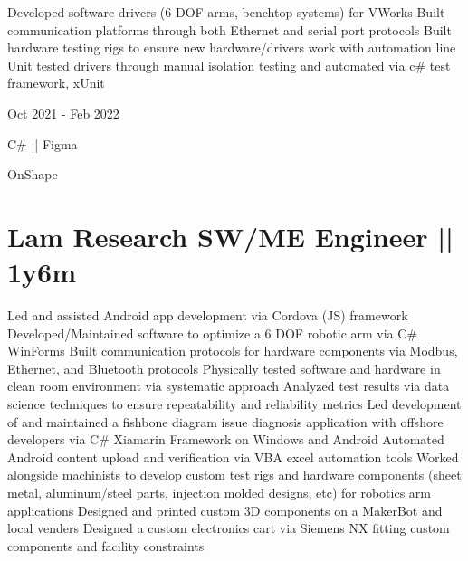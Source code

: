 \vspace{-2.5ex}
\begin{detail}
    \BulletItem
    Developed software drivers (6 DOF arms, benchtop systems) for VWorks
    \BulletItem
    Built communication platforms through both Ethernet and serial port protocols
    \BulletItem
    Built hardware testing rigs to ensure new hardware/drivers work with automation line
    \BulletItem
    Unit tested drivers through manual isolation testing and automated via c\# test framework, xUnit
\end{detail}

\begin{subtitle}
    \vspace{-13.0ex}
    {{Oct 2021 - Feb 2022}}
\end{subtitle}

{\vspace{5ex} \color{cyan}\small {C\# || Figma}}

{
\vspace{-2.5ex}\hspace{3.17in} \color{cyan} \small
{OnShape} }
\vspace{1ex}


\section
{\textbf{Lam Research} \newline
SW/ME Engineer || 1y6m}{}

\vspace{-2.5ex}
\begin{detail}
    \BulletItem
    Led and assisted Android app development via Cordova (JS) framework
    \BulletItem
    Developed/Maintained software to optimize a 6 DOF robotic arm via C\# WinForms
    \BulletItem
    Built communication protocols for hardware components via Modbus, Ethernet, and Bluetooth protocols
    \BulletItem
    Physically tested software and hardware in clean room environment via systematic approach
    \BulletItem
    Analyzed test results via data science techniques to ensure repeatability and reliability metrics
    \BulletItem
    Led development of and maintained a fishbone diagram issue diagnosis application with offshore developers via C\# Xiamarin Framework on Windows and Android
    \BulletItem
    Automated Android content upload and verification via VBA excel automation tools
    \BulletItem
    Worked alongside machinists to develop custom test rigs and hardware components (sheet metal, aluminum/steel parts, injection molded designs, etc) for robotics arm applications
    \BulletItem
    Designed and printed custom 3D components on a MakerBot and local venders
    \BulletItem
    Designed a custom electronics cart via Siemens NX fitting custom components and facility constraints
    
\end{detail}


